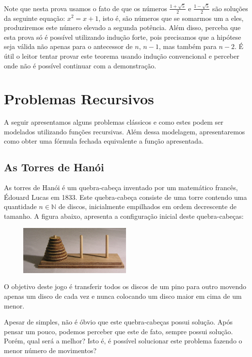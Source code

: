 Note que nesta prova usamos o fato de que os números $\frac{1 +
  \sqrt{5}}{2}$ e $\frac{1 -\sqrt{5}}{2}$ são soluções da seguinte
equação: $x^2 = x + 1$, isto é, são números que se somarmos um a eles,
produziremos este número elevado a segunda potência. Além disso,
perceba que esta
prova só é possível utilizando indução forte, pois precisamos que a
hipótese seja válida não apenas para o antecessor de $n$, $ n - 1$,
mas também para $n - 2$. É útil o leitor tentar provar este teorema
usando indução convencional e perceber onde não é possível continuar
com a demonstração.

\section{Problemas Recursivos}

A seguir apresentamos alguns problemas clássicos e como estes podem
ser modelados utilizando funções recursivas. Além dessa modelagem,
apresentaremos como obter uma fórmula fechada equivalente a função apresentada.

\subsection{As Torres de Hanói}

As torres de Hanói é um quebra-cabeça inventado por um matemático
francês, Édouard Lucas em 1833.  Este quebra-cabeça consiste de uma
torre contendo uma quantidade $n\in\mathbb{N}$ de discos, inicialmente
empilhados em ordem decrescente de tamanho. A figura abaixo, apresenta
a configuração inicial deste quebra-cabeças:

\begin{figure}[h!]
  \centering
      \includegraphics[width=0.5\textwidth]{imagens/torredehanoi.jpg}
 \end{figure}
O objetivo deste jogo é transferir todos os discos de um pino para
outro movendo apenas um disco de cada vez e nunca colocando um disco
maior em cima de um menor.

Apesar de simples, não é óbvio que este quebra-cabeças possui
solução. Após pensar um pouco, podemos perceber que este de fato,
sempre possui solução. Porém, qual será a melhor? Isto é, é possível
solucionar este problema fazendo o menor número de movimentos?

